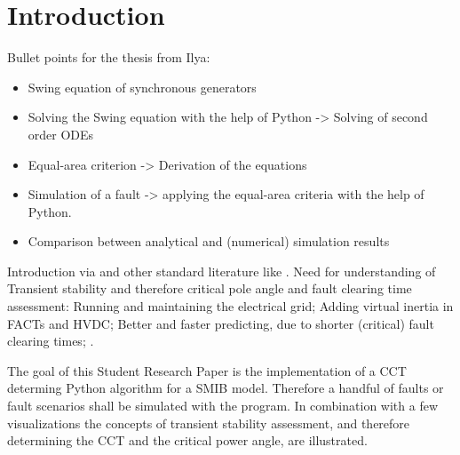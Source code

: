 
\chapter{Introduction}
\label{chap:intro}

Bullet points for the thesis from Ilya:
\begin{itemize}
    \item Swing equation of synchronous generators
    \item Solving the Swing equation with the help of Python -> Solving of second order ODEs
    \item Equal-area criterion -> Derivation of the equations
    \item Simulation of a fault -> applying the equal-area criteria with the help of Python.
    \item Comparison between analytical and (numerical) simulation results
\end{itemize}

Introduction via \autocite{vdeverbandderelektrotechnikelektronikinformationstechnike.v.PerspektivenElektrischenEnergieubertragung2019} and other standard literature like \autocite{gloverPowerSystemAnalysis2017,kundurPowerSystemStability2022,machowskiPowerSystemDynamics2020,oedingElektrischeKraftwerkeUnd2016,schwabElektroenergiesystemeSmarteStromversorgung2022}. Need for understanding of Transient stability and therefore critical pole angle and fault clearing time assessment: Running and maintaining the electrical grid; Adding virtual inertia in FACTs and HVDC; Better and faster predicting, due to shorter (critical) fault clearing times; . 


The goal of this Student Research Paper is the implementation of a \ac{CCT} determing Python algorithm for a \ac{SMIB} model. Therefore a handful of faults or fault scenarios shall be simulated with the program. In combination with a few visualizations the concepts of transient stability assessment, and therefore determining the \ac{CCT} and the critical power angle, are illustrated.

%     
